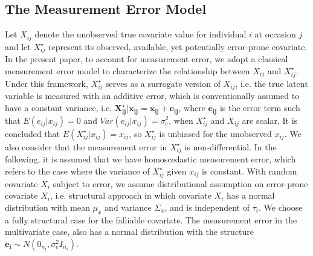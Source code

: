 \documentclass[twoside]{article}
\begin{document}
  \subsection{The Measurement Error Model}
 Let $X_{ij}$ denote the unobserved true covariate value for individual $i$ at occasion $j$ and let $X_{ij}^{\star}$ represent its observed, available, yet potentially error-prone covariate. In the present paper, to account for measurement error, we adopt a classical measurement error model to characterize the relationship between $X_{ij}$ and $X_{ij}^{\star}$. Under this framework, $X_{ij}^{\star}$ serves as a surrogate version of $X_{ij}$, i.e. the true latent variable is measured with an additive error, which is conventionally assumed to have a constant variance, i.e.
$\boldsymbol{X_{ij}^{\star}|x_{ij}=x_{ij}+e_{ij}}$, 
where $\boldsymbol{e_{ij}}$ is the error term such that $E(e_{ij}|x_{ij})=0$ and $Var(e_{ij}|x_{ij})=\sigma _e ^2$, when $X_{ij}^{\star}$ and $X_{ij}$ are scalar. It is concluded that $E(X_{ij}^{\star}|x_{ij})=x_{ij}$, so $X_{ij}^{\star}$ is unbiased for the unobserved $x_{ij}$. We also consider that the measurement error in $X_{ij}^{\star}$ is non-differential.
In the following, it is assumed that we have homoscedastic measurement error, which refers to the case where the variance of $X_{ij}^{\star}$ given $x_{ij}$ is constant. With random covariate $X_i$ subject to error, we assume distributional assumption on error-prone covariate $X_i$, i.e. structural approach in which covariate $X_i$ has a normal distribution with mean $\mu _x$ and variance $\Sigma _x$, and is independent of $\tau _i$. We choose a fully structural case for the falliable covariate.
  The measurement error in the multivariate case, also has a normal distribution with the structure $\boldsymbol{e_i} \sim N(0_{n_i},\sigma_e^2 I_{n_i}).$
\end{document}
